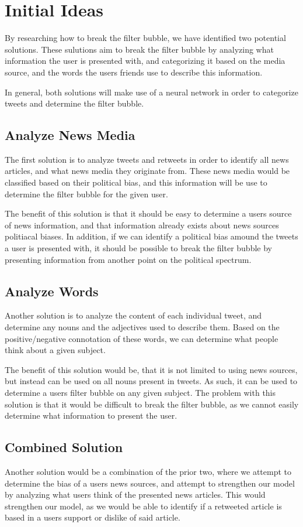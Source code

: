 \chapter{Initial Ideas}
By researching how to break the filter bubble, we have identified two potential
solutions. These sulutions aim to break the filter bubble by analyzing what
information the user is presented with, and categorizing it based on the media
source, and the words the users friends use to describe this information.\nl

In general, both solutions will make use of a neural network in order to
categorize tweets and determine the filter bubble.

\section{Analyze News Media}
The first solution is to analyze tweets and retweets in order to identify all
news articles, and what news media they originate from. These news media would
be classified based on their political bias, and this information will be use to
determine the filter bubble for the given user.\nl

The benefit of this solution is that it should be easy to determine a users
source of news information, and that information already exists about news
sources politiacal biases. In addition, if we can identify a political bias
amound the tweets a user is presented with, it should be possible to break the
filter bubble by presenting information from another point on the political
spectrum.

\section{Analyze Words}
Another solution is to analyze the content of each individual tweet, and
determine any nouns and the adjectives used to describe them. Based on the
positive/negative connotation of these words, we can determine what people think
about a given subject.\nl

The benefit of this solution would be, that it is not limited to using news
sources, but instead can be used on all nouns present in tweets. As such, it can
be used to determine a users filter bubble on any given subject. The problem
with this solution is that it would be difficult to break the filter bubble, as
we cannot easily determine what information to present the user.

\section{Combined Solution}
Another solution would be a combination of the prior two, where we attempt to
determine the bias of a users news sources, and attempt to strengthen our model
by analyzing what users think of the presented news articles. This would
strengthen our model, as we would be able to identify if a retweeted article is
based in a users support or dislike of said article.
